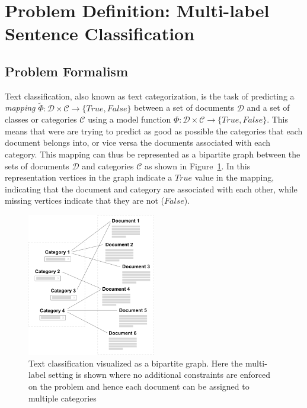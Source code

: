 
\clearpage\section{Problem Definition: Multi-label Sentence Classification}
\label{sec:Problem Definition: Text Classification}

\subsection{Problem Formalism}
\label{subs:Problem Formalism}

Text classification, also known as text categorization, is the task of predicting a \emph{mapping} $\widetilde{\Phi} : \mathcal{D} \times \mathcal{C} \rightarrow \{True, False\}$ between a set of documents $\mathcal{D}$ and a set of classes or categories $\mathcal{C}$ using a model function $\Phi : \mathcal{D} \times \mathcal{C} \rightarrow \{True, False\}$. This means that were are trying to predict as good as possible the categories that each document belongs into, or vice versa the documents associated with each category. This mapping can thus be represented as a bipartite graph between the sets of documents $\mathcal{D}$ and categories $\mathcal{C}$ as shown in Figure~\ref{fig:bipartite-graph-text-classification}. In this representation vertices in the graph indicate a $True$ value in the mapping, indicating that the document and category are associated with each other, while missing vertices indicate that they are not ($False$).


\begin{figure}
  \begin{center}
    \includegraphics[width=0.5\textwidth]{img/bipartite-graph-text-classification}
  \end{center}
  \caption{Text classification visualized as a bipartite graph. Here the multi-label setting is shown where no additional constraints are enforced on the problem and hence each document can be assigned to multiple categories}
\label{fig:bipartite-graph-text-classification}
\end{figure}

